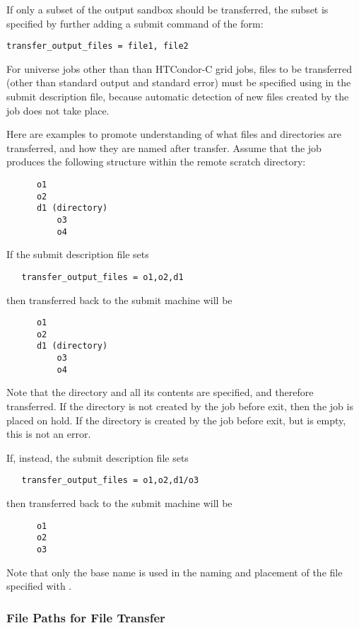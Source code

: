 If only a subset of the output sandbox should be transferred,
the subset is specified by further adding a submit command of the form:
\footnotesize
\begin{verbatim}
transfer_output_files = file1, file2
\end{verbatim}
\normalsize

For  universe jobs other than than HTCondor-C grid jobs,
files to be transferred 
(other than standard output and standard error)
must be specified using 
in the submit description file, because automatic detection of new files
created by the job does not take place.

Here are examples to promote understanding of what files and
directories are transferred, and how they are named after transfer.
Assume that the job produces the following structure within the
remote scratch directory:
\begin{verbatim}
      o1
      o2
      d1 (directory)
          o3
          o4 
\end{verbatim}

If the submit description file sets
\begin{verbatim}
   transfer_output_files = o1,o2,d1
\end{verbatim}
then transferred back to the submit machine will be
\begin{verbatim}
      o1
      o2
      d1 (directory)
          o3
          o4 
\end{verbatim}
Note that the directory  and all its contents are specified,
and therefore transferred.  
If the directory  is not created by the job before exit,
then the job is placed on hold. 
If the directory  is created by the job before exit,
but is empty, this is not an error.

If, instead, the submit description file sets
\begin{verbatim}
   transfer_output_files = o1,o2,d1/o3
\end{verbatim}
then transferred back to the submit machine will be
\begin{verbatim}
      o1
      o2
      o3
\end{verbatim}
Note that only the base name is used in the naming and placement
of the file specified with .


\subsubsection{File Paths for File Transfer}

